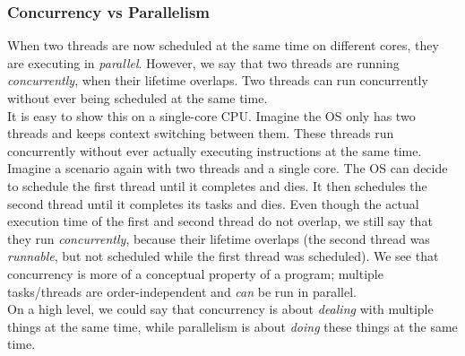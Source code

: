 \documentclass[main]{subfiles}
\begin{document}
\subsubsection{Concurrency vs Parallelism}
When two threads are now scheduled at the same time on different cores, they are executing in \textit{parallel}. However, we say that two threads are running \textit{concurrently}, when their lifetime overlaps. Two threads can run concurrently without ever being scheduled at the same time.\\
It is easy to show this on a single-core CPU. Imagine the OS only has two threads and keeps context switching between them. These threads run concurrently without ever actually executing instructions at the same time.\\
Imagine a scenario again with two threads and a single core. The OS can decide to schedule the first thread until it completes and dies. It then schedules the second thread until it completes its tasks and dies. Even though the actual execution time of the first and second thread do not overlap, we still say that they run \textit{concurrently}, because their lifetime overlaps (the second thread was \textit{runnable}, but not scheduled while the first thread was scheduled). We see that concurrency is more of a conceptual property of a program; multiple tasks/threads are order-independent and \textit{can} be run in parallel.\\
On a high level, we could say that concurrency is about \textit{dealing} with multiple things at the same time, while parallelism is about \textit{doing} these things at the same time.
\end{document}
